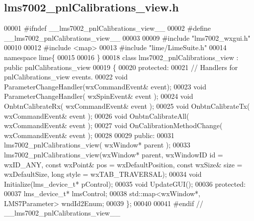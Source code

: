 \subsection{lms7002\+\_\+pnl\+Calibrations\+\_\+view.\+h}
\label{lms7002__pnlCalibrations__view_8h_source}

\begin{DoxyCode}
00001 \textcolor{preprocessor}{#ifndef \_\_lms7002\_pnlCalibrations\_view\_\_}
00002 \textcolor{preprocessor}{#define \_\_lms7002\_pnlCalibrations\_view\_\_}
00003 
00009 \textcolor{preprocessor}{#include "lms7002_wxgui.h"}
00010 
00012 \textcolor{preprocessor}{#include <map>}
00013 \textcolor{preprocessor}{#include "lime/LimeSuite.h"}
00014 \textcolor{keyword}{namespace }lime\{
00015 
00016 \}
00018 \textcolor{keyword}{class }lms7002_pnlCalibrations_view : \textcolor{keyword}{public} pnlCalibrations_view
00019 \{
00020     \textcolor{keyword}{protected}:
00021         \textcolor{comment}{// Handlers for pnlCalibrations\_view events.}
00022         \textcolor{keywordtype}{void} ParameterChangeHandler(wxCommandEvent& event);
00023         \textcolor{keywordtype}{void} ParameterChangeHandler( wxSpinEvent& event );
00024         \textcolor{keywordtype}{void} OnbtnCalibrateRx( wxCommandEvent& event );
00025         \textcolor{keywordtype}{void} OnbtnCalibrateTx( wxCommandEvent& event );
00026         \textcolor{keywordtype}{void} OnbtnCalibrateAll( wxCommandEvent& event );
00027         \textcolor{keywordtype}{void} OnCalibrationMethodChange( wxCommandEvent& event );
00028 
00029     \textcolor{keyword}{public}:
00031         lms7002_pnlCalibrations_view( wxWindow* parent );
00033         lms7002_pnlCalibrations_view(wxWindow* parent, wxWindowID \textcolor{keywordtype}{id} = wxID\_ANY, \textcolor{keyword}{const} wxPoint& pos = 
      wxDefaultPosition, \textcolor{keyword}{const} wxSize& size = wxDefaultSize, \textcolor{keywordtype}{long} style = wxTAB\_TRAVERSAL);
00034     \textcolor{keywordtype}{void} Initialize(lms_device_t* pControl);
00035     \textcolor{keywordtype}{void} UpdateGUI();
00036 \textcolor{keyword}{protected}:
00037     lms_device_t* lmsControl;
00038     std::map<wxWindow*, LMS7Parameter> wndId2Enum;
00039 \};
00040 
00041 \textcolor{preprocessor}{#endif // \_\_lms7002\_pnlCalibrations\_view\_\_}
\end{DoxyCode}

